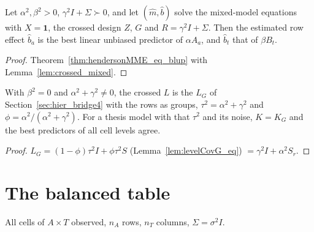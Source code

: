 \begin{theorem}\label{thm:crossed_henderson}
  \leanok
  Let $\alpha^2, \beta^2 > 0$, $\gamma^2 I + \Sigma \succ 0$, and let $(\hat m, \hat b)$ solve the
  mixed-model equations with $X = \mathbf 1$, the crossed design $Z$, $G$ and
  $R = \gamma^2 I + \Sigma$. Then the estimated row effect $\hat b_a$ is the best linear unbiased
  predictor of $\alpha A_a$, and $\hat b_t$ that of $\beta B_t$.
\end{theorem}
\begin{proof}
  \leanok
  Theorem~\ref{thm:hendersonMME_eq_blup} with Lemma~\ref{lem:crossed_mixed}.
\end{proof}

\begin{theorem}\label{thm:crossed_bridge4}
  \leanok
  With $\beta^2 = 0$ and $\alpha^2 + \gamma^2 \ne 0$, the crossed $L$ is the $L_G$ of
  Section~\ref{sec:hier_bridge4} with the rows as groups, $\tau^2 = \alpha^2 + \gamma^2$ and
  $\phi = \alpha^2/(\alpha^2 + \gamma^2)$. For a thesis model with that $\tau^2$ and its noise,
  $K = K_G$ and the best predictors of all cell levels agree.
\end{theorem}
\begin{proof}
  \leanok
  $L_G = (1 - \phi)\tau^2 I + \phi\tau^2 S$ (Lemma~\ref{lem:levelCovG_eq}) $= \gamma^2 I + \alpha^2 S_r$.
\end{proof}

\section{The balanced table}\label{sec:crossed_balanced}

All cells of $A \times T$ observed, $n_A$ rows, $n_T$ columns, $\Sigma = \sigma^2 I$.

